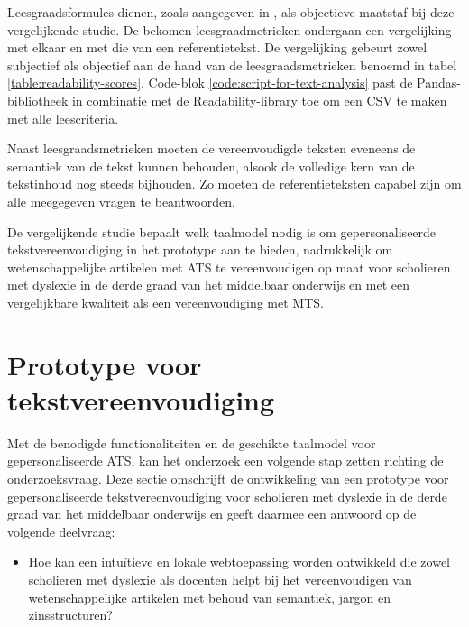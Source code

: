 Leesgraadsformules dienen, zoals aangegeven in \textcite{Nenkova2004}, als objectieve maatstaf bij deze vergelijkende studie. De bekomen leesgraadmetrieken ondergaan een vergelijking met elkaar en met die van een referentietekst. De vergelijking gebeurt zowel subjectief als objectief aan de hand van de leesgraadsmetrieken benoemd in tabel \ref{table:readability-scores}. Code-blok \ref{code:script-for-text-analysis} past de Pandas-bibliotheek in combinatie met de Readability-library toe om een CSV te maken met alle leescriteria.

\medspace

Naast leesgraadsmetrieken moeten de vereenvoudigde teksten eveneens de semantiek van de tekst kunnen behouden, alsook de volledige kern van de tekstinhoud nog steeds bijhouden. Zo moeten de referentieteksten capabel zijn om alle meegegeven vragen te beantwoorden.

\medspace

De vergelijkende studie bepaalt welk taalmodel nodig is om gepersonaliseerde tekstvereenvoudiging in het prototype aan te bieden, nadrukkelijk om wetenschappelijke artikelen met ATS te vereenvoudigen op maat voor scholieren met dyslexie in de derde graad van het middelbaar onderwijs en met een vergelijkbare kwaliteit als een vereenvoudiging met MTS. 








\section{Prototype voor tekstvereenvoudiging}

Met de benodigde functionaliteiten en de geschikte taalmodel voor gepersonaliseerde ATS, kan het onderzoek een volgende stap zetten richting de onderzoeksvraag. Deze sectie omschrijft de ontwikkeling van een prototype voor gepersonaliseerde tekstvereenvoudiging voor scholieren met dyslexie in de derde graad van het middelbaar onderwijs en geeft daarmee een antwoord op de volgende deelvraag: 

\begin{itemize}
	\item Hoe kan een intuïtieve en lokale webtoepassing worden ontwikkeld die zowel scholieren met dyslexie als docenten helpt bij het vereenvoudigen van wetenschappelijke artikelen met behoud van semantiek, jargon en zinsstructuren?
\end{itemize}

